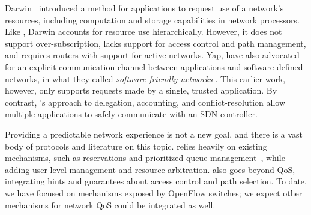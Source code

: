 
%
Darwin~\cite{Darwin} introduced a method for
applications to request use of a network's resources, including
computation and storage capabilities in network processors. Like
\sys, Darwin accounts for resource use hierarchically. However, it
does not support over-subscription, lacks support for
access control and path management, and requires routers with
support for active networks.
%
Yap, \etal have also advocated for an explicit communication channel
between applications and software-defined networks,
in what they called \emph{software-friendly networks} \cite{Yap:2009}.
This earlier work, however, only supports requests made by a single,
trusted application. By contrast, \sys's approach to delegation,
accounting, and conflict-resolution allow multiple applications to
safely communicate with an SDN controller.






Providing a predictable network experience is not a new goal, and there is a
vast body of protocols and literature on this topic.  \sys relies
heavily on existing mechanisms, such as reservations and prioritized
queue management~\cite{Kim:2010,Stoica:1997}, while adding
user-level management and resource arbitration.
\sys also goes beyond QoS, integrating  hints
and guarantees about access control and path selection.
To date, we have focused on mechanisms exposed by OpenFlow
switches; we expect other mechanisms for network QoS %
could be integrated as well.

